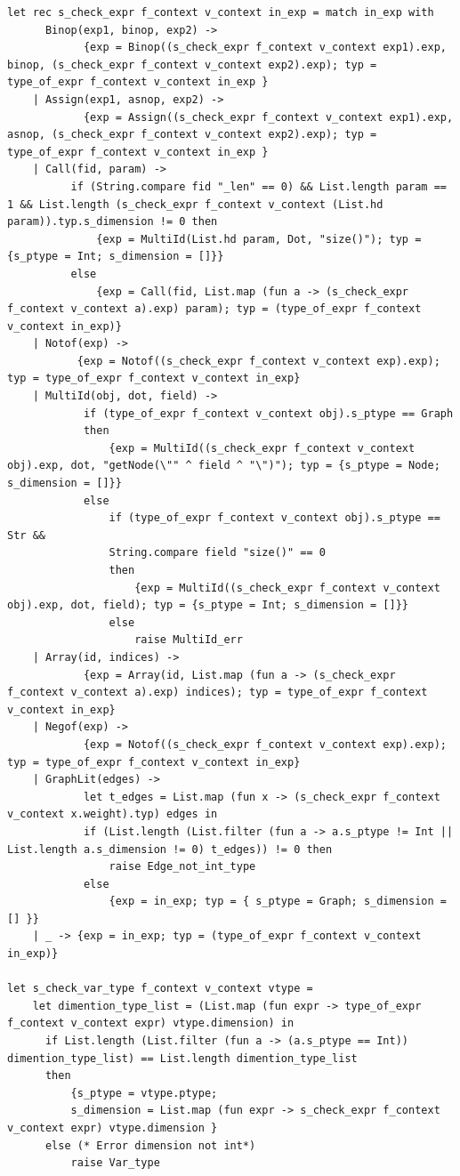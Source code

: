 \documentclass[a4paper,12pt]{article}
\begin{document}
\begin{lstlisting}
let rec s_check_expr f_context v_context in_exp = match in_exp with
      Binop(exp1, binop, exp2) -> 
            {exp = Binop((s_check_expr f_context v_context exp1).exp, binop, (s_check_expr f_context v_context exp2).exp); typ = type_of_expr f_context v_context in_exp }
    | Assign(exp1, asnop, exp2) ->  
            {exp = Assign((s_check_expr f_context v_context exp1).exp, asnop, (s_check_expr f_context v_context exp2).exp); typ = type_of_expr f_context v_context in_exp }
    | Call(fid, param) -> 
          if (String.compare fid "_len" == 0) && List.length param == 1 && List.length (s_check_expr f_context v_context (List.hd param)).typ.s_dimension != 0 then 
              {exp = MultiId(List.hd param, Dot, "size()"); typ = {s_ptype = Int; s_dimension = []}}
          else
              {exp = Call(fid, List.map (fun a -> (s_check_expr f_context v_context a).exp) param); typ = (type_of_expr f_context v_context in_exp)}
    | Notof(exp) -> 
           {exp = Notof((s_check_expr f_context v_context exp).exp); typ = type_of_expr f_context v_context in_exp} 
    | MultiId(obj, dot, field) ->
            if (type_of_expr f_context v_context obj).s_ptype == Graph
            then
                {exp = MultiId((s_check_expr f_context v_context obj).exp, dot, "getNode(\"" ^ field ^ "\")"); typ = {s_ptype = Node; s_dimension = []}}
            else
                if (type_of_expr f_context v_context obj).s_ptype == Str &&
                String.compare field "size()" == 0
                then
                    {exp = MultiId((s_check_expr f_context v_context obj).exp, dot, field); typ = {s_ptype = Int; s_dimension = []}}
                else
                    raise MultiId_err
    | Array(id, indices) -> 
            {exp = Array(id, List.map (fun a -> (s_check_expr f_context v_context a).exp) indices); typ = type_of_expr f_context v_context in_exp}
    | Negof(exp) ->
            {exp = Notof((s_check_expr f_context v_context exp).exp); typ = type_of_expr f_context v_context in_exp} 
    | GraphLit(edges) ->
            let t_edges = List.map (fun x -> (s_check_expr f_context v_context x.weight).typ) edges in
            if (List.length (List.filter (fun a -> a.s_ptype != Int || List.length a.s_dimension != 0) t_edges)) != 0 then
                raise Edge_not_int_type
            else
                {exp = in_exp; typ = { s_ptype = Graph; s_dimension = [] }}
    | _ -> {exp = in_exp; typ = (type_of_expr f_context v_context in_exp)}

let s_check_var_type f_context v_context vtype = 
    let dimention_type_list = (List.map (fun expr -> type_of_expr f_context v_context expr) vtype.dimension) in
      if List.length (List.filter (fun a -> (a.s_ptype == Int)) dimention_type_list) == List.length dimention_type_list
      then
          {s_ptype = vtype.ptype; 
          s_dimension = List.map (fun expr -> s_check_expr f_context v_context expr) vtype.dimension }
      else (* Error dimension not int*)
          raise Var_type


\end{lstlisting}
\end{document}
